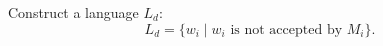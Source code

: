 

\setcounter{section}{8}
\setcounter{subsection}{5}
\setcounter{dfn}{8}


Construct a language $L_d$:
\[
L_d = \{w_i \mid w_i \text{ is not accepted by }M_i\}.
\]



